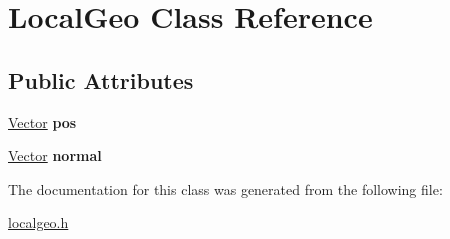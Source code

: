 \hypertarget{class_local_geo}{}\section{Local\+Geo Class Reference}
\label{class_local_geo}
\subsection*{Public Attributes}
\begin{DoxyCompactItemize}
\item 
\mbox{\label{class_local_geo_a250477ff280f55f2c33082e653146865}} 
\mbox{\hyperlink{struct_vector}{Vector}} {\bfseries pos}
\item 
\mbox{\label{class_local_geo_adeb9082888ca936c56cf6c97a005b237}} 
\mbox{\hyperlink{struct_vector}{Vector}} {\bfseries normal}
\end{DoxyCompactItemize}


The documentation for this class was generated from the following file\+:\begin{DoxyCompactItemize}
\item 
\mbox{\hyperlink{localgeo_8h}{localgeo.\+h}}\end{DoxyCompactItemize}

